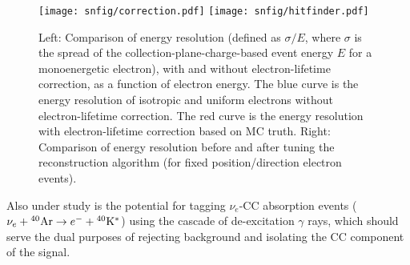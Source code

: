 %
\begin{figure}[!htb] %
 \centering
\texttt{[image: snfig/correction.pdf]} 
\texttt{[image: snfig/hitfinder.pdf]} 
 \caption[Comparisons of energy resolution]{Left: Comparison of energy
   resolution (defined as $\sigma/E$, where $\sigma$ is the spread of
   the collection-plane-charge-based event energy $E$ for a
   monoenergetic electron), with and without electron-lifetime
   correction, as a function of electron energy. The blue curve is the
   energy resolution of isotropic and uniform electrons without
   electron-lifetime correction. The red curve is the energy
   resolution with electron-lifetime correction based on MC truth.
   Right: Comparison of energy resolution before and after tuning the
   reconstruction algorithm (for fixed position/direction electron
   events).}\label{fig:lowe_res}
\end{figure}


Also under study is the potential for tagging $\nu_e$-CC absorption
events ($\nu_e +{}^{40}{\rm Ar} \rightarrow e^- +{}^{40}{\rm
  K^*}$) using the cascade of de-excitation $\gamma$ rays, which should
serve the dual purposes of rejecting background and isolating the CC
component of the signal.  


